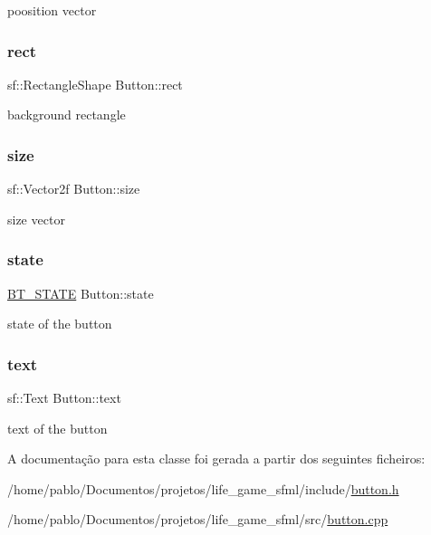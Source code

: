 poosition vector 

\mbox{\label{classButton_a8d1ded1e184e2495c36160c885574a1c}} 
\subsubsection{\texorpdfstring{rect}{rect}}
{\footnotesize\ttfamily sf\+::\+Rectangle\+Shape Button\+::rect\hspace{0.3cm}{\ttfamily [private]}}



background rectangle 

\mbox{\label{classButton_ae2858ccb82273767d44ec2bc952dd07c}} 
\subsubsection{\texorpdfstring{size}{size}}
{\footnotesize\ttfamily sf\+::\+Vector2f Button\+::size\hspace{0.3cm}{\ttfamily [private]}}



size vector 

\mbox{\label{classButton_aa405a1238e29323bbdcf1c08f83d3f0f}} 
\subsubsection{\texorpdfstring{state}{state}}
{\footnotesize\ttfamily \hyperlink{button_8h_a40b271baa2a62e00c1925f51d7698146}{B\+T\+\_\+\+S\+T\+A\+TE} Button\+::state\hspace{0.3cm}{\ttfamily [private]}}



state of the button 

\mbox{\label{classButton_aadf908b0777f2ae5c28d949fda3384c1}} 
\subsubsection{\texorpdfstring{text}{text}}
{\footnotesize\ttfamily sf\+::\+Text Button\+::text\hspace{0.3cm}{\ttfamily [private]}}



text of the button 



A documentação para esta classe foi gerada a partir dos seguintes ficheiros\+:\begin{DoxyCompactItemize}
\item 
/home/pablo/\+Documentos/projetos/life\+\_\+game\+\_\+sfml/include/\hyperlink{button_8h}{button.\+h}\item 
/home/pablo/\+Documentos/projetos/life\+\_\+game\+\_\+sfml/src/\hyperlink{button_8cpp}{button.\+cpp}\end{DoxyCompactItemize}
